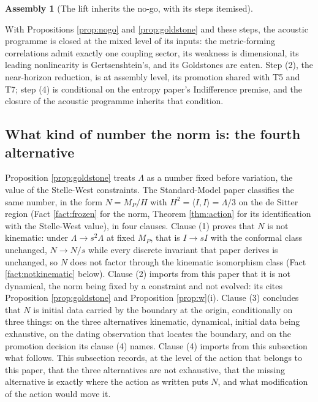 \documentclass[11pt]{article}
\theoremstyle{definition}
\newtheorem{assembly}[theorem]{Assembly}
\newcommand{\ip}[2]{\langle #1, #2\rangle}
\begin{document}
\begin{assembly}[The lift inherits the no-go, with its steps itemised]
\begin{enumerate}
\end{enumerate}
With Propositions \ref{prop:nogo} and \ref{prop:goldstone} and these steps, the acoustic programme is closed at the mixed level of its inputs: the metric-forming correlations admit exactly one coupling sector, its weakness is dimensional, its leading nonlinearity is Gertsenshtein's, and its Goldstones are eaten. Step (2), the near-horizon reduction, is at assembly level, its promotion shared with T5 and T7; step (4) is conditional on the entropy paper's Indifference premise, and the closure of the acoustic programme inherits that condition.
\end{assembly}


\subsection{What kind of number the norm is: the fourth alternative}\label{subsec:fourth}

Proposition \ref{prop:goldstone} treats $\Lambda$ as a number fixed before variation, the value of the Stelle-West constraints. The Standard-Model paper \cite[Prop.~7.6]{ButlerT12} classifies the same number, in the form $N = M_P/H$ with $H^2 = \ip{I}{I} = \Lambda/3$ on the de Sitter region (Fact \ref{fact:frozen} for the norm, Theorem \ref{thm:action} for its identification with the Stelle-West value), in four clauses. Clause (1) proves that $N$ is not kinematic: under $\Lambda \to s^2\Lambda$ at fixed $M_P$, that is $I \to sI$ with the conformal class unchanged, $N \to N/s$ while every discrete invariant that paper derives is unchanged, so $N$ does not factor through the kinematic isomorphism class (Fact \ref{fact:notkinematic} below). Clause (2) imports from this paper that it is not dynamical, the norm being fixed by a constraint and not evolved: its \cite[Fact~2.10]{ButlerT12} cites Proposition \ref{prop:goldstone} and Proposition \ref{prop:w}(i). Clause (3) concludes that $N$ is initial data carried by the boundary at the origin, conditionally on three things: on the three alternatives kinematic, dynamical, initial data being exhaustive, on the dating observation \cite[Obs.~7.4]{ButlerT12} that locates the boundary, and on the promotion decision its clause (4) names. Clause (4) imports from this subsection what follows. This subsection records, at the level of the action that belongs to this paper, that the three alternatives are not exhaustive, that the missing alternative is exactly where the action as written puts $N$, and what modification of the action would move it.
\end{document}
